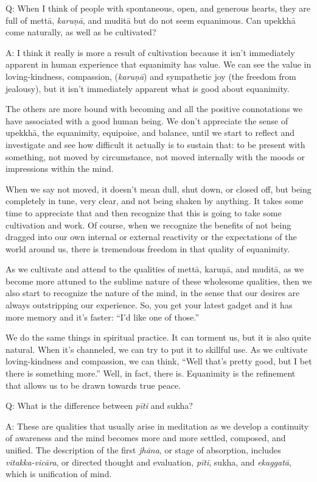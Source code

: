 \qaspace
Q: When I think of people with spontaneous, open, and generous hearts,
they are full of mettā, \emph{karuṇā}, and muditā but do not seem
equanimous. Can upekkhā come naturally, as well as be cultivated?

\qaspace
A: I think it really is more a result of cultivation because it isn’t
immediately apparent in human experience that equanimity has value. We
can see the value in loving-kindness, compassion, (\emph{karuṇā}) and
sympathetic joy (the freedom from jealousy), but it isn’t immediately
apparent what is good about equanimity.

The others are more bound with becoming and all the positive
connotations we have associated with a good human being. We don’t
appreciate the sense of upekkhā, the equanimity, equipoise, and balance,
until we start to reflect and investigate and see how difficult it
actually is to sustain that: to be present with something, not moved by
circumstance, not moved internally with the moods or impressions within
the mind.

When we say not moved, it doesn’t mean dull, shut down, or closed off,
but being completely in tune, very clear, and not being shaken by
anything. It takes some time to appreciate that and then recognize that
this is going to take some cultivation and work. Of course, when we
recognize the benefits of not being dragged into our own internal or
external reactivity or the expectations of the world around us, there is
tremendous freedom in that quality of equanimity.

As we cultivate and attend to the qualities of mettā, karuṇā, and
muditā, as we become more attuned to the sublime nature of these
wholesome qualities, then we also start to recognize the nature of the
mind, in the sense that our desires are always outstripping our
experience. So, you get your latest gadget and it has more memory and
it’s faster: “I’d like one of those.”

We do the same things in spiritual practice. It can torment us, but it
is also quite natural. When it’s channeled, we can try to put it to
skillful use. As we cultivate loving-kindness and compassion, we can
think, “Well that’s pretty good, but I bet there is something more.”
Well, in fact, there is. Equanimity is the refinement that allows us to
be drawn towards true peace.

\qaspace
Q: What is the difference between \emph{pīti} and sukha?

\qaspace
A: These are qualities that usually arise in meditation as we develop a
continuity of awareness and the mind becomes more and more settled,
composed, and unified. The description of the first \emph{jhāna}, or
stage of absorption, includes \emph{vitakka-vicāra}, or directed thought
and evaluation, \emph{pīti}, sukha, and \emph{ekaggatā}, which is
unification of mind.

